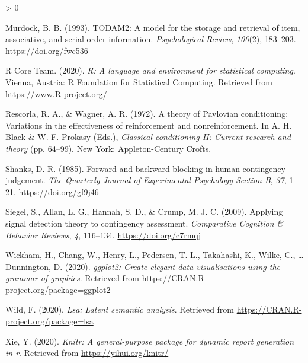 \documentclass[
  english,
  man,floatsintext]{apa6}
\newlength{\cslhangindent}
\newenvironment{CSLReferences}[2] %
 {%
  \setlength{\parindent}{0pt}
  \ifodd #1 \everypar{\setlength{\hangindent}{\cslhangindent}}\ignorespaces\fi
  \ifnum #2 > 0
  \setlength{\parskip}{#2\baselineskip}
  \fi
 }%
 {}
\begin{document}
\begin{CSLReferences}{1}{0}
\leavevmode\hypertarget{ref-murdockTODAM2ModelStorage1993}{}%
Murdock, B. B. (1993). {TODAM2}: A model for the storage and retrieval of item, associative, and serial-order information. \emph{Psychological Review}, \emph{100}(2), 183--203. \url{https://doi.org/fwc536}

\leavevmode\hypertarget{ref-R-base}{}%
R Core Team. (2020). \emph{R: A language and environment for statistical computing}. Vienna, Austria: R Foundation for Statistical Computing. Retrieved from \url{https://www.R-project.org/}

\leavevmode\hypertarget{ref-rescorlaTheoryPavlovianConditioning1972}{}%
Rescorla, R. A., \& Wagner, A. R. (1972). A theory of {Pavlovian} conditioning: {Variations} in the effectiveness of reinforcement and nonreinforcement. In A. H. Black \& W. F. Prokasy (Eds.), \emph{Classical conditioning {II}: {Current} research and theory} (pp. 64--99). {New York: Appleton-Century Crofts}.

\leavevmode\hypertarget{ref-shanksForwardBackwardBlocking1985}{}%
Shanks, D. R. (1985). Forward and backward blocking in human contingency judgement. \emph{The Quarterly Journal of Experimental Psychology Section B}, \emph{37}, 1--21. \url{https://doi.org/gf9j46}

\leavevmode\hypertarget{ref-siegelApplyingSignalDetection2009}{}%
Siegel, S., Allan, L. G., Hannah, S. D., \& Crump, M. J. C. (2009). Applying signal detection theory to contingency assessment. \emph{Comparative Cognition \& Behavior Reviews}, \emph{4}, 116--134. \url{https://doi.org/c7rmqj}

\leavevmode\hypertarget{ref-R-ggplot2}{}%
Wickham, H., Chang, W., Henry, L., Pedersen, T. L., Takahashi, K., Wilke, C., \ldots{} Dunnington, D. (2020). \emph{ggplot2: Create elegant data visualisations using the grammar of graphics}. Retrieved from \url{https://CRAN.R-project.org/package=ggplot2}

\leavevmode\hypertarget{ref-R-lsa}{}%
Wild, F. (2020). \emph{Lsa: Latent semantic analysis}. Retrieved from \url{https://CRAN.R-project.org/package=lsa}

\leavevmode\hypertarget{ref-R-knitr}{}%
Xie, Y. (2020). \emph{Knitr: A general-purpose package for dynamic report generation in r}. Retrieved from \url{https://yihui.org/knitr/}

\end{CSLReferences}

\endgroup


\clearpage
\makeatletter
\efloat@restorefloats
\makeatother
\end{document}
